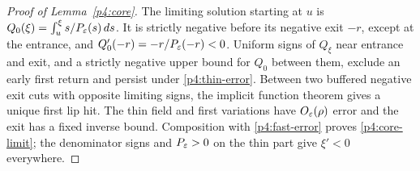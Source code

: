 \begin{proof}[Proof of Lemma~\ref{p4:core}]
The limiting solution starting at $u$ is
$Q_0(\xi)=\int_u^\xi s/P_\varepsilon(s)\,d s$.
It is strictly negative before its negative exit $-r$, except at
the entrance, and $Q_0'(-r)=-r/P_\varepsilon(-r)<0$.
Uniform signs of $Q_\xi$ near entrance and exit, and a strictly
negative upper bound for $Q_0$ between them, exclude an early first
return and persist under \eqref{p4:thin-error}.
Between two buffered negative exit cuts with opposite limiting signs,
the implicit function theorem gives a unique first lip hit. The thin
field and first variations have $O_\varepsilon(\rho)$ error and the exit has
a fixed inverse bound. Composition with \eqref{p4:fast-error} proves
\eqref{p4:core-limit}; the denominator signs and $P_\varepsilon>0$ on the
thin part give $\xi'<0$ everywhere.
\end{proof}
